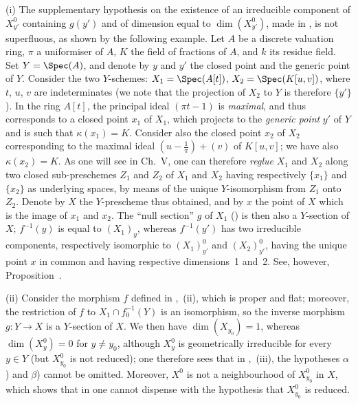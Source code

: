\begin{remarks}[15.6.10]
\label{IV.15.6.10}
(i)
The supplementary hypothesis on the existence of an irreducible component of $X_{y'}^0$ containing $g(y')$ and of dimension equal to $\dim(X_{y'}^0)$, made in , is not superfluous, as shown by the following example.
Let $A$ be a discrete valuation ring, $\pi$ a uniformiser of $A$, $K$ the field of fractions of $A$, and $k$ its residue field. Set $Y=\Spec(A)$, and denote by $y$ and $y'$ the closed point and the generic point of $Y$.
Consider the two $Y$-schemes: $X_1=\Spec(A[t])$, $X_2=\Spec(K[u,v])$, where $t$, $u$, $v$ are indeterminates (we note that the projection of $X_2$ to $Y$ is therefore $\{y'\}$).
In the ring $A[t]$, the principal ideal $(\pi t-1)$ is \emph{maximal}, and thus corresponds to a closed point $x_1$ of $X_1$, which projects to the \emph{generic point} $y'$ of $Y$ and is such that $\kappa(x_1)=K$.
Consider also the closed point $x_2$ of $X_2$ corresponding to the maximal ideal $\left(u-\frac{1}{\pi}\right)+(v)$ of $K[u,v]$; we have also $\kappa(x_2)=K$.
As one will see in Ch.\ V, one can therefore \emph{reglue} $X_1$ and $X_2$ along two closed sub-preschemes $Z_1$ and $Z_2$ of $X_1$ and $X_2$ having respectively $\{x_1\}$ and $\{x_2\}$ as underlying spaces, by means of the unique $Y$-isomorphism from $Z_1$ onto $Z_2$.
Denote by $X$ the $Y$-prescheme thus obtained, and by $x$ the point of $X$ which is the image of $x_1$ and $x_2$.
The ``null section'' $g$ of $X_1$ () is then also a $Y$-section of $X$; $f^{-1}(y)$ is equal to $(X_1)_y$, whereas $f^{-1}(y')$ has two irreducible components, respectively isomorphic to $(X_1)_{y'}^0$ and $(X_2)_{y'}^0$, having the unique point $x$ in common and having respective dimensions~1 and~2. See, however, Proposition~.

(ii)
Consider the morphism $f$ defined in ,~(ii), which is proper and flat; moreover, the restriction of $f$ to $X_1\cap f_0^{-1}(Y)$ is an isomorphism, so the inverse morphism $g:Y\to X$ is a $Y$-section of $X$.
We then have $\dim(X_{y_0})=1$, whereas $\dim(X_y^0)=0$ for $y\neq y_0$, although $X_y^0$ is geometrically irreducible for every $y\in Y$ (but $X_{y_0}^0$ is not reduced); one therefore sees that in ,~(iii), the hypotheses $\alpha$) and $\beta$) cannot be omitted.
Moreover, $X^0$ is not a neighbourhood of $X_{y_0}^0$ in $X$, which shows that in  one cannot dispense with the hypothesis that $X_{y_0}^0$ is reduced.


\end{remarks}
